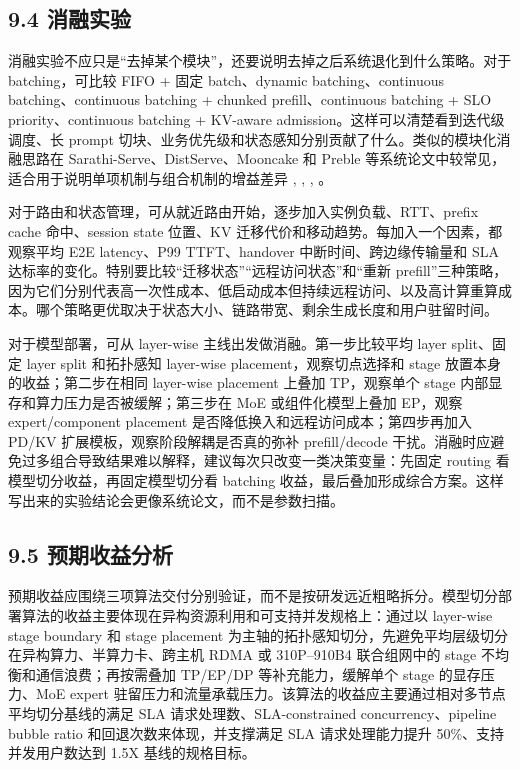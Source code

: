 \subsection*{9.4 消融实验}

消融实验不应只是“去掉某个模块”，还要说明去掉之后系统退化到什么策略。对于 batching，可比较 FIFO + 固定 batch、dynamic batching、continuous batching、continuous batching + chunked prefill、continuous batching + SLO priority、continuous batching + KV-aware admission。这样可以清楚看到迭代级调度、长 prompt 切块、业务优先级和状态感知分别贡献了什么。类似的模块化消融思路在 Sarathi-Serve、DistServe、Mooncake 和 Preble 等系统论文中较常见，适合用于说明单项机制与组合机制的增益差异 \cite{agrawal2024taming}, \cite{zhong2024distserve}, \cite{qin2025mooncake}, \cite{srivatsa2025preble}。

对于路由和状态管理，可从就近路由开始，逐步加入实例负载、RTT、prefix cache 命中、session state 位置、KV 迁移代价和移动趋势。每加入一个因素，都观察平均 E2E latency、P99 TTFT、handover 中断时间、跨边缘传输量和 SLA 达标率的变化。特别要比较“迁移状态”“远程访问状态”和“重新 prefill”三种策略，因为它们分别代表高一次性成本、低启动成本但持续远程访问、以及高计算重算成本。哪个策略更优取决于状态大小、链路带宽、剩余生成长度和用户驻留时间。

对于模型部署，可从 layer-wise 主线出发做消融。第一步比较平均 layer split、固定 layer split 和拓扑感知 layer-wise placement，观察切点选择和 stage 放置本身的收益；第二步在相同 layer-wise placement 上叠加 TP，观察单个 stage 内部显存和算力压力是否被缓解；第三步在 MoE 或组件化模型上叠加 EP，观察 expert/component placement 是否降低换入和远程访问成本；第四步再加入 PD/KV 扩展模板，观察阶段解耦是否真的弥补 prefill/decode 干扰。消融时应避免过多组合导致结果难以解释，建议每次只改变一类决策变量：先固定 routing 看模型切分收益，再固定模型切分看 batching 收益，最后叠加形成综合方案。这样写出来的实验结论会更像系统论文，而不是参数扫描。


\subsection*{9.5 预期收益分析}

预期收益应围绕三项算法交付分别验证，而不是按研发远近粗略拆分。模型切分部署算法的收益主要体现在异构资源利用和可支持并发规格上：通过以 layer-wise stage boundary 和 stage placement 为主轴的拓扑感知切分，先避免平均层级切分在异构算力、半算力卡、跨主机 RDMA 或 310P--910B4 联合组网中的 stage 不均衡和通信浪费；再按需叠加 TP/EP/DP 等补充能力，缓解单个 stage 的显存压力、MoE expert 驻留压力和流量承载压力。该算法的收益应主要通过相对多节点平均切分基线的满足 SLA 请求处理数、SLA-constrained concurrency、pipeline bubble ratio 和回退次数来体现，并支撑满足 SLA 请求处理能力提升 50\%、支持并发用户数达到 1.5X 基线的规格目标。

